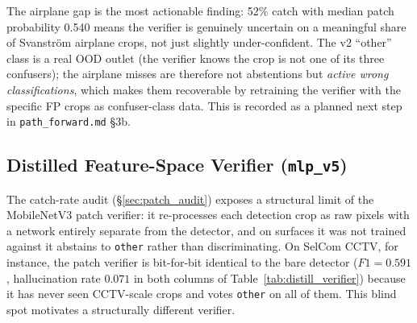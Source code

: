\documentclass[12pt,a4paper,oneside,openright]{book}
\begin{document}
The airplane gap is the most actionable finding: 52\% catch with median patch probability 0.540 means the verifier is genuinely uncertain on a meaningful share of Svanstr\"om airplane crops, not just slightly under-confident. The v2 ``other'' class is a real OOD outlet (the verifier knows the crop is not one of its three confusers); the airplane misses are therefore not abstentions but \emph{active wrong classifications}, which makes them recoverable by retraining the verifier with the specific FP crops as confuser-class data. This is recorded as a planned next step in \texttt{path\_forward.md} \S3b.

\subsection{Distilled Feature-Space Verifier (\texttt{mlp\_v5})}
\label{sec:distill_verifier}

The catch-rate audit (\S\ref{sec:patch_audit}) exposes a structural limit of the MobileNetV3 patch verifier: it re-processes each detection crop as raw pixels with a network entirely separate from the detector, and on surfaces it was not trained against it abstains to \texttt{other} rather than discriminating. On SelCom CCTV, for instance, the patch verifier is bit-for-bit identical to the bare detector ($F1=0.591$, hallucination rate $0.071$ in both columns of Table~\ref{tab:distill_verifier}) because it has never seen CCTV-scale crops and votes \texttt{other} on all of them. This blind spot motivates a structurally different verifier.
\end{document}
